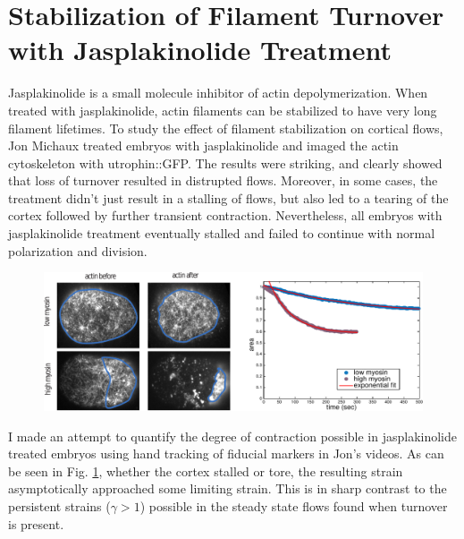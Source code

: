 \section{Stabilization of Filament Turnover with Jasplakinolide Treatment}

Jasplakinolide is a small molecule inhibitor of actin depolymerization.  When treated with jasplakinolide, actin filaments can be stabilized to have very long filament lifetimes.  To study the effect of filament stabilization on cortical flows, Jon Michaux treated embryos with jasplakinolide and imaged the actin cytoskeleton with utrophin::GFP.  The results were striking, and clearly showed that loss of turnover resulted in distrupted flows.  Moreover, in some cases, the treatment didn't just result in a stalling of flows, but also led to a tearing of the cortex followed by further transient contraction.  Nevertheless, all embryos with jasplakinolide treatment eventually stalled and failed to continue with normal polarization and division.

\begin{figure}[h!]
	\centering
	\includegraphics[width=\hsize]{data/jasp_flow_stop.pdf}
	\caption{\label{fig:jasp_flow_stop}    }
\end{figure}

I made an attempt to quantify the degree of contraction possible in jasplakinolide treated embryos using hand tracking of fiducial markers in Jon's videos.  As can be seen in Fig. \ref{fig:jasp_flow_stop}, whether the cortex stalled or tore, the resulting strain asymptotically approached some limiting strain.  This is in sharp contrast to the persistent strains ($\gamma>1$) possible in the steady state flows found when turnover is present.